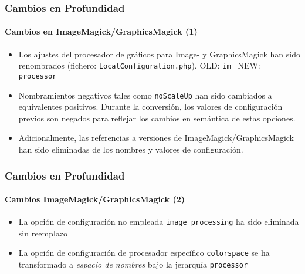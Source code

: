 \begin{frame}[fragile]
	\frametitle{Cambios en Profundidad}
	\framesubtitle{Cambios en ImageMagick/GraphicsMagick (1)}

	\lstset{basicstyle=\tiny\ttfamily}

	\begin{itemize}

		\item Los ajustes del procesador de gráficos para Image- y GraphicsMagick han sido renombrados
			(fichero: \texttt{LocalConfiguration.php}).\newline
			OLD:\tabto{1.0cm} \texttt{im\_}\newline
			NEW:\tabto{1.0cm} \texttt{processor\_}

		\item Nombramientos negativos tales como \texttt{noScaleUp} han sido cambiados a equivalentes positivos.
			Durante la conversión, los valores de configuración previos son negados para reflejar los
			cambios en semántica de estas opciones.

		\item Adicionalmente, las referencias a versiones de ImageMagick/GraphicsMagick han sido
			eliminadas de los nombres y valores de configuración.

	\end{itemize}

\end{frame}

\begin{frame}[fragile]
	\frametitle{Cambios en Profundidad}
	\framesubtitle{Cambios ImageMagick/GraphicsMagick (2)}

	\lstset{basicstyle=\tiny\ttfamily}

	\begin{itemize}

		\item La opción de configuración no empleada \texttt{image\_processing} ha sido eliminada sin
			reemplazo

		\item La opción de configuración de procesador específico \texttt{colorspace} se ha transformado a \textit{espacio de nombres}
			bajo la jerarquía \texttt{processor\_}

	\end{itemize}

\end{frame}

